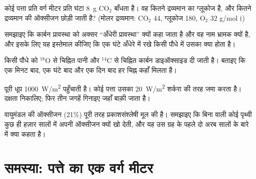 \begin{exercise}[$\star\star$]\label{exo:g12:photosynthesis:11}
कोई पत्ता प्रति वर्ग मीटर प्रति घंटा \qty{8}{g} $\mathrm{CO_2}$ बाँधता है।
वह कितने द्रव्यमान का ग्लूकोज है, और कितने द्रव्यमान की ऑक्सीजन छोड़ी जाती
है? (मोलर द्रव्यमान: $\mathrm{CO_2}$ 44, ग्लूकोज 180, $\mathrm{O_2}$ 32
\unit{g/mol}।)
\end{exercise}

\begin{exercise}[$\star\star\star$]\label{exo:g12:photosynthesis:12}
समझाइए कि कार्बन प्रावस्था को अक्सर ``अँधेरी प्रावस्था'' क्यों कहा जाता है
और वह नाम भ्रामक क्यों है, और इसके लिए यह इस्तेमाल कीजिए कि एक घंटे अँधेरे
में रखे किसी पौधे में उसका क्या होता है।
\end{exercise}

\begin{exercise}[$\star\star\star$]\label{exo:g12:photosynthesis:13}
किसी पौधे को $^{18}$O से चिह्नित पानी और $^{14}$C से चिह्नित कार्बन
डाइऑक्साइड दी जाती है। बताइए कि एक मिनट बाद, एक घंटे बाद और एक दिन बाद हर
चिह्न कहाँ मिलता है।
\end{exercise}

\begin{exercise}[$\star\star\star$]\label{exo:g12:photosynthesis:14}
पूरी धूप \qty{1000}{W/m^2} पहुँचाती है। कोई पत्ता उसका \qty{20}{W/m^2}
शर्करा की तरह जमा करता है। दक्षता निकालिए; फिर तीन जगहें गिनाइए जहाँ बाक़ी
जाता है।
\end{exercise}

\begin{exercise}[$\star\star\star$]\label{exo:g12:photosynthesis:15}
वायुमंडल की ऑक्सीजन (21\%) पूरी तरह प्रकाशसंश्लेषी मूल की है। समझाइए कि
बिना  वाली कोई पृथ्वी कुछ ही हज़ार सालों में अपनी ऑक्सीजन
क्यों खो देती, और यह उस ग्रह के पहले दो अरब सालों के बारे में क्या कहता है।
\end{exercise}

\section{समस्या: पत्ते का एक वर्ग मीटर}


